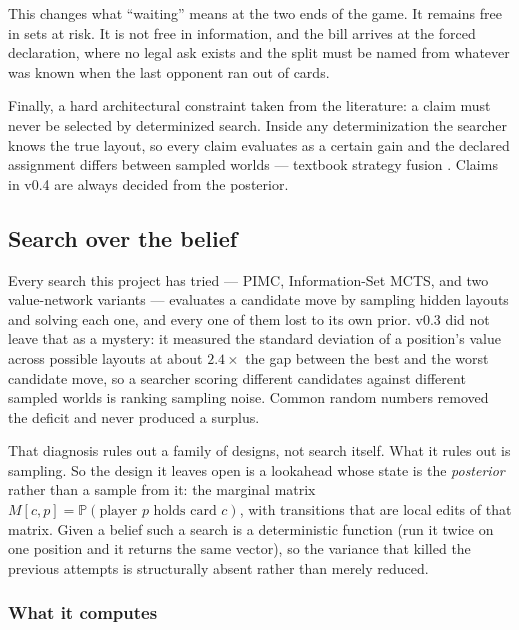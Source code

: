 \documentclass[11pt,letterpaper]{article}
\newcommand{\Prob}{\ensuremath{\mathbb{P}}}
\begin{document}
This changes what ``waiting'' means at the two ends of the game. It remains
free in sets at risk. It is not free in information, and the bill arrives at
the forced declaration, where no legal ask exists and the split must be named
from whatever was known when the last opponent ran out of cards.

Finally, a hard architectural constraint taken from the literature: a claim must
never be selected by determinized search. Inside any determinization the
searcher knows the true layout, so every claim evaluates as a certain gain and
the declared assignment differs between sampled worlds --- textbook strategy
fusion \citep{frank1998search}. Claims in v0.4 are always decided from the
posterior.

\subsection{Search over the belief}
\label{sec:lookahead}

Every search this project has tried --- PIMC, Information-Set MCTS, and two
value-network variants --- evaluates a candidate move by sampling hidden layouts
and solving each one, and every one of them lost to its own prior. v0.3 did not
leave that as a mystery: it measured the standard deviation of a position's
value across possible layouts at about $2.4\times$ the gap between the best and
the worst candidate move, so a searcher scoring different candidates against
different sampled worlds is ranking sampling noise. Common random numbers
removed the deficit and never produced a surplus.

That diagnosis rules out a family of designs, not search itself. What it rules
out is sampling. So the design it leaves open is a lookahead whose state is the
\emph{posterior} rather than a sample from it: the marginal matrix
$M[c,p] = \Prob(\text{player } p \text{ holds card } c)$, with transitions that
are local edits of that matrix. Given a belief such a search is a deterministic
function (run it twice on one position and it returns the same vector), so
the variance that killed the previous attempts is structurally absent rather
than merely reduced.

\subsubsection{What it computes}
\end{document}
